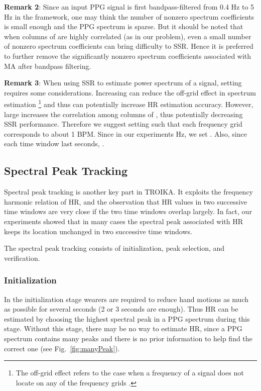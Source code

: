 \documentclass[10pt,twocolumn]{IEEEtran}
\begin{document}
\textbf{Remark 2}: Since an input PPG signal is first bandpass-filtered from 0.4 Hz to 5 Hz in the framework, one may think the number of nonzero spectrum coefficients is small enough and the PPG spectrum is  sparse. But it should be noted that when columns of  are highly correlated (as in our problem), even a small number of nonzero spectrum coefficients can bring difficulty to SSR. Hence it is preferred to further remove the significantly nonzero spectrum coefficients associated with MA after bandpass filtering.


\textbf{Remark 3}: When using SSR to estimate power spectrum of a signal, setting  requires some considerations. Increasing  can reduce the off-grid effect in spectrum estimation \footnote{The off-grid effect refers to the case when a frequency of a signal does not locate on any of the frequency grids .} and thus can potentially increase HR estimation accuracy. However, large  increases the correlation among columns of , thus potentially decreasing SSR performance. Therefore we suggest  setting  such that each frequency grid  corresponds to about 1 BPM. Since in our experiments  Hz, we set . Also, since each time window last  seconds, .





\subsection{Spectral Peak Tracking}

Spectral peak tracking is another key part in TROIKA. It exploits the frequency harmonic relation of HR, and the observation that HR values in two successive time windows are very close if the two time windows overlap largely. In fact,  our experiments showed that in many cases the spectral peak associated with HR keeps its location unchanged in two successive time windows.

The spectral peak tracking consists of initialization, peak selection, and verification.


\subsubsection{Initialization}

In the initialization stage wearers are required to reduce hand motions as much as possible for several seconds (2 or 3 seconds are enough). Thus HR can be estimated by choosing the highest spectral peak in a PPG spectrum during this stage. Without this stage, there may be no way to estimate HR, since a PPG spectrum contains many peaks and there is no prior information to help find the correct one (see Fig.~\ref{fig:manyPeak}).
\end{document}
